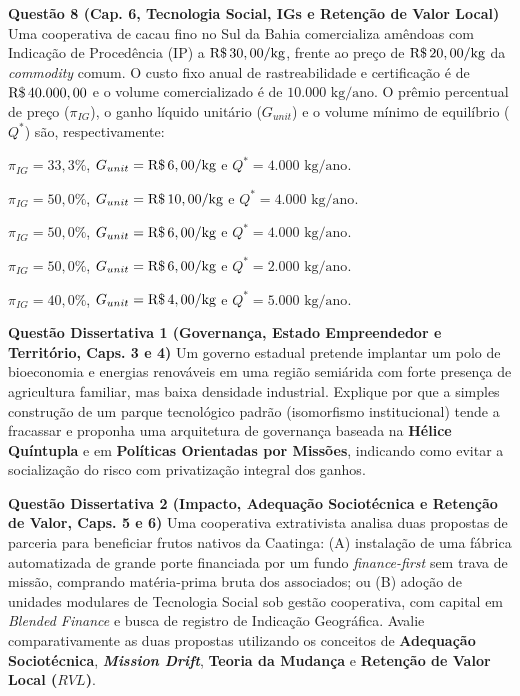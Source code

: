 \textbf{Questão 8 (Cap. 6, Tecnologia Social, IGs e Retenção de Valor Local)}
Uma cooperativa de cacau fino no Sul da Bahia comercializa amêndoas com Indicação de Procedência (IP) a $\text{R\$\,}{30,00}/\text{kg}$, frente ao preço de $\text{R\$\,}{20,00}/\text{kg}$ da \textit{commodity} comum. O custo fixo anual de rastreabilidade e certificação é de $\text{R\$\,}{40.000,00}$ e o volume comercializado é de $10.000\text{ kg/ano}$. O prêmio percentual de preço ($\pi_{IG}$), o ganho líquido unitário ($G_{unit}$) e o volume mínimo de equilíbrio ($Q^*$) são, respectivamente:
\begin{alternativas}
  \item $\pi_{IG} = 33{,}3\%$, $G_{unit} = \text{R\$\,}{6,00}/\text{kg}$ e $Q^* = 4.000\text{ kg/ano}$.
  \item $\pi_{IG} = 50{,}0\%$, $G_{unit} = \text{R\$\,}{10,00}/\text{kg}$ e $Q^* = 4.000\text{ kg/ano}$.
  \item $\pi_{IG} = 50{,}0\%$, $G_{unit} = \text{R\$\,}{6,00}/\text{kg}$ e $Q^* = 4.000\text{ kg/ano}$.
  \item $\pi_{IG} = 50{,}0\%$, $G_{unit} = \text{R\$\,}{6,00}/\text{kg}$ e $Q^* = 2.000\text{ kg/ano}$.
  \item $\pi_{IG} = 40{,}0\%$, $G_{unit} = \text{R\$\,}{4,00}/\text{kg}$ e $Q^* = 5.000\text{ kg/ano}$.
\end{alternativas}


\textbf{Questão Dissertativa 1 (Governança, Estado Empreendedor e Território, Caps. 3 e 4)}
Um governo estadual pretende implantar um polo de bioeconomia e energias renováveis em uma região semiárida com forte presença de agricultura familiar, mas baixa densidade industrial. Explique por que a simples construção de um parque tecnológico padrão (isomorfismo institucional) tende a fracassar e proponha uma arquitetura de governança baseada na \textbf{Hélice Quíntupla} e em \textbf{Políticas Orientadas por Missões}, indicando como evitar a socialização do risco com privatização integral dos ganhos.
\espacoResolucao[3.0cm]

\textbf{Questão Dissertativa 2 (Impacto, Adequação Sociotécnica e Retenção de Valor, Caps. 5 e 6)}
Uma cooperativa extrativista analisa duas propostas de parceria para beneficiar frutos nativos da Caatinga: (A) instalação de uma fábrica automatizada de grande porte financiada por um fundo \textit{finance-first} sem trava de missão, comprando matéria-prima bruta dos associados; ou (B) adoção de unidades modulares de Tecnologia Social sob gestão cooperativa, com capital em \textit{Blended Finance} e busca de registro de Indicação Geográfica. Avalie comparativamente as duas propostas utilizando os conceitos de \textbf{Adequação Sociotécnica}, \textbf{\textit{Mission Drift}}, \textbf{Teoria da Mudança} e \textbf{Retenção de Valor Local ($RVL$)}.
\espacoResolucao[3.0cm]


